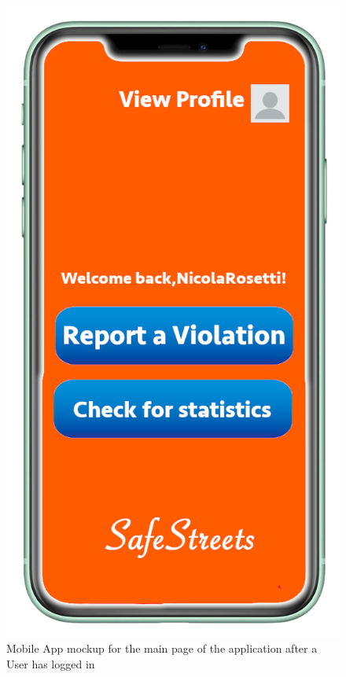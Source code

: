 \documentclass[a4paper]{report}
\begin{document}
\begin{figure}
\begin{minipage}{.45\textwidth}
\centering
\includegraphics[width=.7\linewidth]{mockups/Schermata_principale.png}
\caption[Mobile App mockup for main page]{Mobile App mockup for the main page of the application after a User has logged in }
\label{fig:main-screen}
\end{minipage}
\end{figure}
\end{document}
